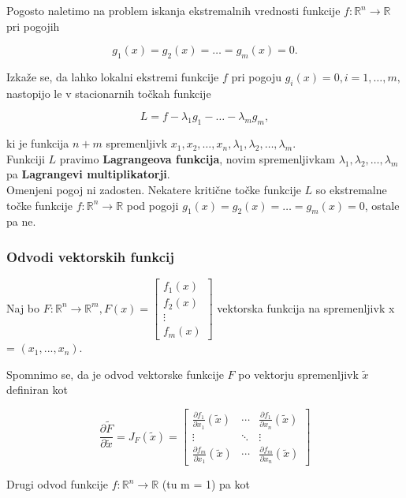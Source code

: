 \documentclass{article}
\begin{document}
\begin{multicols}{2}
Pogosto naletimo na problem iskanja ekstremalnih vrednosti funkcije \( f: \mathbb{R}^n \rightarrow \mathbb{R} \) pri pogojih

\[ g_1(x) = g_2(x) = \ldots = g_m(x) = 0. \]

Izkaže se, da lahko lokalni ekstremi funkcije \( f \) pri pogoju \( g_i(x) = 0, i = 1, \ldots, m, \) nastopijo le v stacionarnih točkah funkcije

\[ L = f - \lambda_1 g_1 - \ldots - \lambda_m g_m, \]

ki je funkcija \( n + m \) spremenljivk \( x_1, x_2, \ldots, x_n, \lambda_1, \lambda_2, \ldots, \lambda_m \).\\
Funkciji \( L \) pravimo \textbf{Lagrangeova funkcija}, novim spremenljivkam \( \lambda_1, \lambda_2, \ldots, \lambda_m \) pa \textbf{Lagrangevi multiplikatorji}.\\
Omenjeni pogoj ni zadosten. Nekatere kritične točke funkcije \( L \) so ekstremalne točke funkcije \( f: \mathbb{R}^n \rightarrow \mathbb{R} \) pod pogoji \( g_1(x) = g_2(x) = \ldots = g_m(x) = 0 \), ostale pa ne.


\subsubsection{Odvodi vektorskih funkcij}
Naj bo \( F: \mathbb{R}^n \rightarrow \mathbb{R}^m, F(x) = 
\begin{bmatrix}
    f_1(x) \\
    f_2(x) \\
    \vdots \\
    f_m(x)
\end{bmatrix} \)
vektorska funkcija na spremenljivk x = \( (x_1, ..., x_n) \).

Spomnimo se, da je odvod vektorske funkcije \( F \) po vektorju spremenljivk \( \tilde{x} \) definiran kot

\[ 
\frac{\partial \tilde{F}}{\partial \tilde{x}} = J_F(\tilde{x}) = 
\begin{bmatrix}
    \frac{\partial f_1}{\partial x_1} (\tilde{x}) & \cdots & \frac{\partial f_1}{\partial x_n} (\tilde{x}) \\
    \vdots & \ddots & \vdots \\
    \frac{\partial f_m}{\partial x_1} (\tilde{x}) & \cdots & \frac{\partial f_m}{\partial x_n} (\tilde{x})
\end{bmatrix}
\]

Drugi odvod funkcije \( f: \mathbb{R}^n \rightarrow \mathbb{R} \) (tu m = 1) pa kot


\end{multicols}
\end{document}
